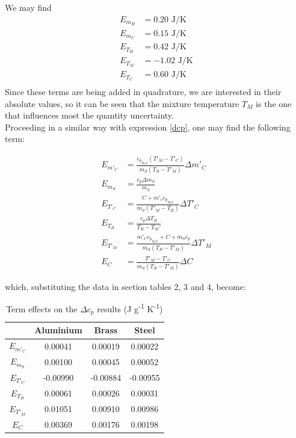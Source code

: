 \documentclass[a4paper, 12pt]{article}
\begin{document}
	We may find \\
	\begin{align*}
		E_{m_H} &= 0.20 \mbox{ J/K}\\
		E_{m_C} &= 0.15 \mbox{ J/K}\\
		E_{T_H} &= 0.42 \mbox{ J/K}\\
		E_{T_M} &= -1.02 \mbox{ J/K}\\
		E_{T_C} &= 0.60 \mbox{ J/K}\\
	\end{align*} 
	Since these terms are being added in quadrature, we are interested in their absolute values, so it can be seen that the mixture temperature $T_M$ is the one that influences most the quantity uncertainty. \\
	
	Proceeding in a similar way with expression \ref{dcp}, one may find the following term:
	
	\begin{align*}
		E_{m'_C} &= \frac{c_{p_{H_2O}} (T'_M - T'_C)}{m_S(T_B - T'_M)}\Delta m'_C \\
		E_{m_S} &= \frac{c_p \Delta m_S}{m_S} \\
		E_{T'_C} &= \frac{C + m'_c c_{p_{H_2O}} }{m_S (T'_M - T_B)}\Delta T'_C \\
		E_{T_B} &= \frac{c_p \Delta T_B}{T_B - T_M'} \\
		E_{T'_M} &= \frac{m'_C c_{p_{H_2O}} + C + m_S c_p}{m_S(T_B - T'_M)}\Delta T'_M \\
		E_{C} &= \frac{T'_M - T'_C}{m_S(T_B - T'_M)}\Delta C
	\end{align*}
	
	which, substituting the data in section tables 2, 3 and 4, become: \\
	\begin{table}[h!]
		\centering
		\caption{Term effects on the $\Delta c_p$ results (J g\textsuperscript{-1} K\textsuperscript{-1})}	
		\begin{tabular}{|c|c|c|c|}
			\hline
				& \textbf{Aluminium} & \textbf{Brass} & \textbf{Steel} \\
			\hline
			$E_{m'_C}$ & 0.00041 & 0.00019 & 0.00022 \\
			$E_{m_S}$ & 0.00100 & 0.00045 & 0.00052 \\
			$E_{T'_C}$ & -0.00990 & -0.00884 & -0.00955 \\
			$E_{T_B}$ & 0.00061 & 0.00026 & 0.00031 \\
			$E_{T'_M}$ & 0.01051 & 0.00910 & 0.00986 \\
			$E_{C}$ & 0.00369 & 0.00176 & 0.00198 \\
			\hline
		\end{tabular}
		
	\end{table}
\end{document}

